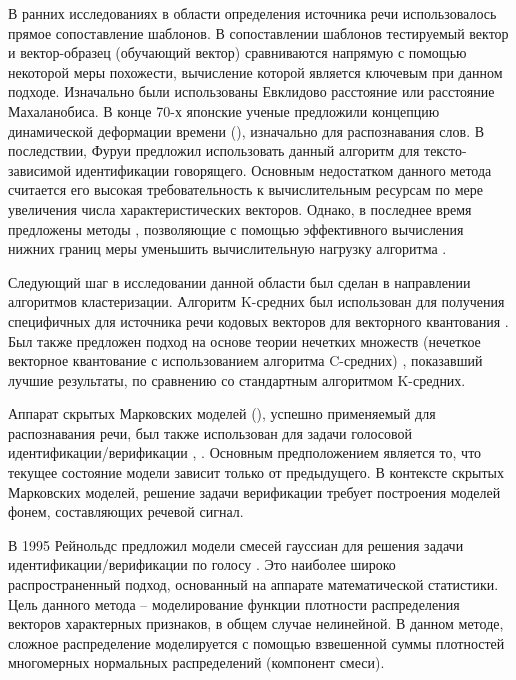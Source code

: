 В ранних исследованиях в области определения источника речи использовалось прямое сопоставление шаблонов. В сопоставлении шаблонов тестируемый вектор и вектор-образец (обучающий вектор) сравниваются напрямую с помощью некоторой меры похожести, вычисление которой является ключевым при данном подходе. Изначально были использованы Евклидово расстояние или расстояние Махаланобиса. В конце 70-х японские ученые предложили \cite{Sakoe78DTW} концепцию динамической деформации времени (), изначально для распознавания слов. В последствии, Фуруи \cite{Furui81cepstral} предложил использовать данный алгоритм для тексто-зависимой идентификации говорящего. Основным недостатком данного метода считается его высокая требовательность к вычислительным ресурсам по мере увеличения числа характеристических векторов. Однако, в последнее время предложены методы \cite{Lemire09dtw}, позволяющие с помощью эффективного вычисления нижних границ меры уменьшить вычислительную нагрузку алгоритма .

Следующий шаг в исследовании данной области был сделан в направлении алгоритмов кластеризации. Алгоритм K-средних был использован для получения специфичных для источника речи кодовых векторов для векторного квантования \cite{Soong85VQ}. Был также предложен подход на основе теории нечетких множеств (нечеткое векторное квантование с использованием алгоритма C-средних) \cite{Bezdek78FVQ}, показавший лучшие результаты, по сравнению со стандартным алгоритмом K-средних.

Аппарат скрытых Марковских моделей (), успешно применяемый для распознавания речи, был также использован для задачи голосовой идентификации/верификации \cite{Olsson02hmmann}, \cite{Falavigna_comparisonof}. Основным предположением является то, что текущее состояние модели зависит только от предыдущего. В контексте скрытых Марковских моделей, решение задачи верификации требует построения моделей фонем, составляющих речевой сигнал.

В 1995 Рейнольдс предложил модели смесей гауссиан для решения задачи идентификации/верификации по голосу \cite{Reynolds95gmm}. Это наиболее широко распространенный подход, основанный на аппарате математической статистики. Цель данного метода -- моделирование функции плотности распределения векторов характерных признаков, в общем случае нелинейной. В данном методе, сложное распределение моделируется с помощью взвешенной суммы плотностей многомерных нормальных распределений (компонент смеси).


